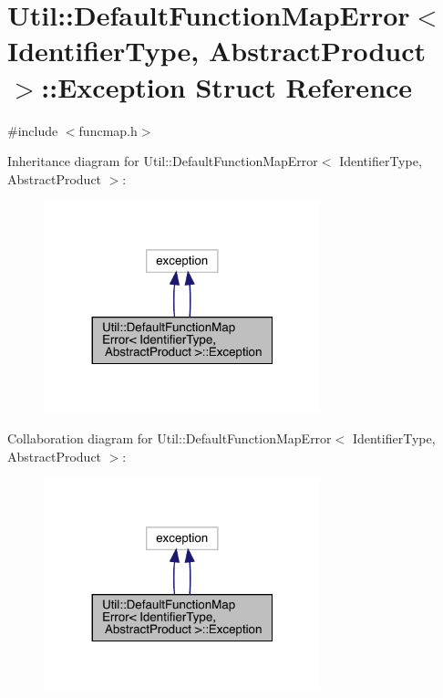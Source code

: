 \hypertarget{structUtil_1_1DefaultFunctionMapError_1_1Exception}{}\section{Util\+:\+:Default\+Function\+Map\+Error$<$ Identifier\+Type, Abstract\+Product $>$\+:\+:Exception Struct Reference}
\label{structUtil_1_1DefaultFunctionMapError_1_1Exception}


{\ttfamily \#include $<$funcmap.\+h$>$}



Inheritance diagram for Util\+:\+:Default\+Function\+Map\+Error$<$ Identifier\+Type, Abstract\+Product $>$\+:\nopagebreak
\begin{figure}[H]
\begin{center}
\leavevmode
\includegraphics[width=227pt]{df/d36/structUtil_1_1DefaultFunctionMapError_1_1Exception__inherit__graph}
\end{center}
\end{figure}


Collaboration diagram for Util\+:\+:Default\+Function\+Map\+Error$<$ Identifier\+Type, Abstract\+Product $>$\+:\nopagebreak
\begin{figure}[H]
\begin{center}
\leavevmode
\includegraphics[width=227pt]{df/d10/structUtil_1_1DefaultFunctionMapError_1_1Exception__coll__graph}
\end{center}
\end{figure}
